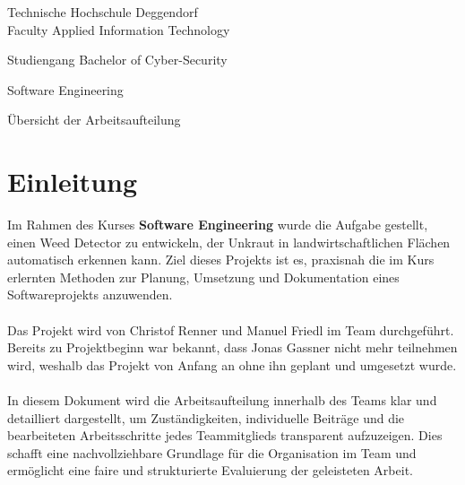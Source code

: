 \documentclass[12pt]{scrartcl}
\newcommand{\faculty}{Faculty Applied Information Technology}
\newcommand{\studies}{Bachelor of Cyber-Security}
\newcommand{\thesistitleDE}{Software Engineering}
\newcommand{\thesistitleEN}{Übersicht der Arbeitsaufteilung}
\begin{document}
\begin{titlepage}
\begin{center}
    {%
    Technische Hochschule Deggendorf\\
    \faculty\par}
    \vspace{.2cm}
    
    {\Large Studiengang \studies\\}
    \vspace{2\baselineskip}
    
    {\Huge{}\thesistitleDE\par}
    \vspace{1cm}
    {\Huge{}\thesistitleEN\par}
    \vspace{3\baselineskip}
    
\end{center}
\end{titlepage}
\cleardoublepage
\tableofcontents
\newpage
\section{Einleitung}
Im Rahmen des Kurses \textbf{Software Engineering} wurde die Aufgabe gestellt, einen Weed Detector zu entwickeln, der Unkraut in landwirtschaftlichen Flächen automatisch erkennen kann. Ziel dieses Projekts ist es, praxisnah die im Kurs erlernten Methoden zur Planung, Umsetzung und Dokumentation eines Softwareprojekts anzuwenden.\\
\\
Das Projekt wird von Christof Renner und Manuel Friedl im Team durchgeführt. Bereits zu Projektbeginn war bekannt, dass Jonas Gassner nicht mehr teilnehmen wird, weshalb das Projekt von Anfang an ohne ihn geplant und umgesetzt wurde.\\
\\
In diesem Dokument wird die Arbeitsaufteilung innerhalb des Teams klar und detailliert dargestellt, um Zuständigkeiten, individuelle Beiträge und die bearbeiteten Arbeitsschritte jedes Teammitglieds transparent aufzuzeigen. Dies schafft eine nachvollziehbare Grundlage für die Organisation im Team und ermöglicht eine faire und strukturierte Evaluierung der geleisteten Arbeit.
\end{document}
